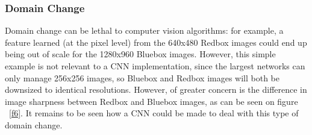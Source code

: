 \documentclass[a4paper,11pt]{article}
\begin{document}
\subsubsection{Domain Change}


Domain change can be lethal to computer vision algorithms: for example, a feature learned (at the pixel level) from the 640x480 Redbox images could end up being out of scale for the 1280x960 Bluebox images. However, this simple example is not relevant to a CNN implementation, since the largest networks can only manage 256x256 images, so Bluebox and Redbox images will both be downsized to identical resolutions. However, of greater concern is the difference in image sharpness between Redbox and Bluebox images, as can be seen on figure ~\ref{f6}. It remains to be seen how a CNN could be made to deal with this type of domain change.
\end{document}

